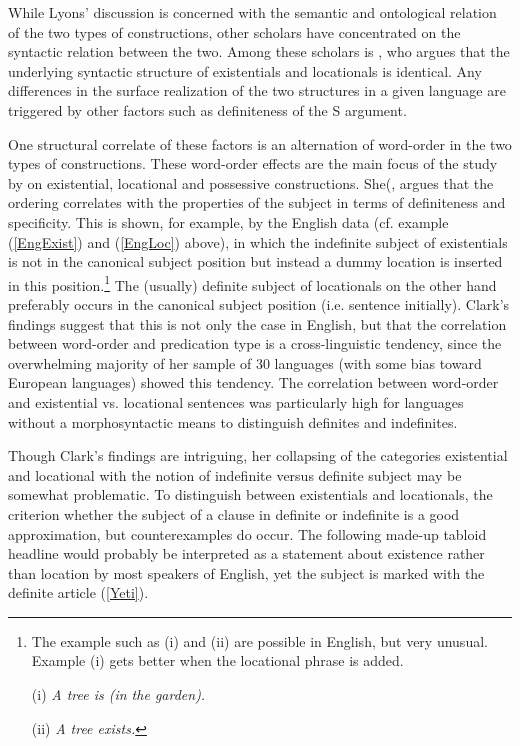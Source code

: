While Lyons' discussion is concerned with the semantic and ontological relation of the two types of constructions, other scholars have concentrated on the syntactic relation between the two. 
Among these scholars is \citet{Freeze:1992}, who argues that the underlying syntactic structure of existentials and locationals is identical. 
Any differences in the surface realization of the two structures in a given language are triggered by other factors such as definiteness of the S argument.

One structural correlate of these factors is an alternation of word-order in the two types of constructions. 
These word-order effects are the main focus of the study by \citet{Clark:1978} on existential, locational and possessive constructions.
She(, argues that the ordering correlates with the properties of the subject in terms of definiteness and specificity.
This is shown, for example, by the English data (cf. example (\ref{EngExist}) and (\ref{EngLoc}) above), in which the indefinite subject of existentials is not in the canonical subject position but instead a dummy location is inserted in this position.\footnote{The example such as (i) and (ii) are possible in English, but very unusual. Example (i) gets better when the locational phrase is added.

(i) \textit{A tree is (in the garden).} 

(ii) \textit{A tree exists.} }
 The (usually) definite subject of locationals on the other hand preferably occurs in the canonical subject position (i.e. sentence initially).
Clark's findings suggest that this is not only the case in English, but that the correlation between word-order and predication type is a cross-linguistic tendency, since the overwhelming majority of her sample of 30 languages (with some bias toward European languages) showed this tendency. 
The correlation between word-order and existential vs. locational sentences was particularly high for languages without a morphosyntactic means to distinguish definites and indefinites.

Though Clark's findings are intriguing, her collapsing of the categories existential and locational with the notion of indefinite versus definite subject may be somewhat problematic. To distinguish between existentials and locationals, the criterion whether the subject of a clause in definite or indefinite is a good approximation, but counterexamples do occur. 
The following made-up tabloid headline would probably be interpreted as a statement about existence rather than location by most speakers of English, yet the subject is marked with the definite article (\ref{Yeti}).\enlargethispage{\baselineskip}

